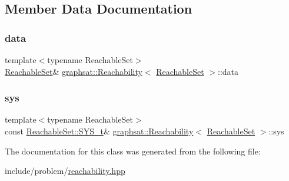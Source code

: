 \subsection{Member Data Documentation}
\mbox{\label{classgraphsat_1_1_reachability_a4583b76bbe56a7a2310cacd2721a9c8b}} 
\subsubsection{\texorpdfstring{data}{data}}
{\footnotesize\ttfamily template$<$typename Reachable\+Set$>$ \\
\mbox{\hyperlink{classgraphsat_1_1_reachable_set}{Reachable\+Set}}\& \mbox{\hyperlink{classgraphsat_1_1_reachability}{graphsat\+::\+Reachability}}$<$ \mbox{\hyperlink{classgraphsat_1_1_reachable_set}{Reachable\+Set}} $>$\+::data\hspace{0.3cm}{\ttfamily [private]}}

\mbox{\label{classgraphsat_1_1_reachability_a1613b8cf310ab4d48241a2f65d00f25d}} 
\subsubsection{\texorpdfstring{sys}{sys}}
{\footnotesize\ttfamily template$<$typename Reachable\+Set$>$ \\
const \mbox{\hyperlink{classgraphsat_1_1_reachable_set_a28cb7ce6be4d0a31c7249085f09432c5}{Reachable\+Set\+::\+S\+Y\+S\+\_\+t}}\& \mbox{\hyperlink{classgraphsat_1_1_reachability}{graphsat\+::\+Reachability}}$<$ \mbox{\hyperlink{classgraphsat_1_1_reachable_set}{Reachable\+Set}} $>$\+::sys\hspace{0.3cm}{\ttfamily [private]}}



The documentation for this class was generated from the following file\+:\begin{DoxyCompactItemize}
\item 
include/problem/\mbox{\hyperlink{reachability_8hpp}{reachability.\+hpp}}\end{DoxyCompactItemize}
